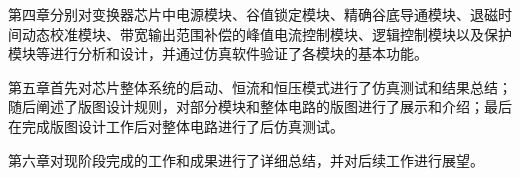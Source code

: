 
第四章分别对变换器芯片中电源模块、谷值锁定模块、精确谷底导通模块、退磁时间动态校准模块、带宽输出范围补偿的峰值电流控制模块、逻辑控制模块以及保护模块等进行分析和设计，并通过仿真软件验证了各模块的基本功能。

第五章首先对芯片整体系统的启动、恒流和恒压模式进行了仿真测试和结果总结；随后阐述了版图设计规则，对部分模块和整体电路的版图进行了展示和介绍；最后在完成版图设计工作后对整体电路进行了后仿真测试。 

第六章对现阶段完成的工作和成果进行了详细总结，并对后续工作进行展望。






